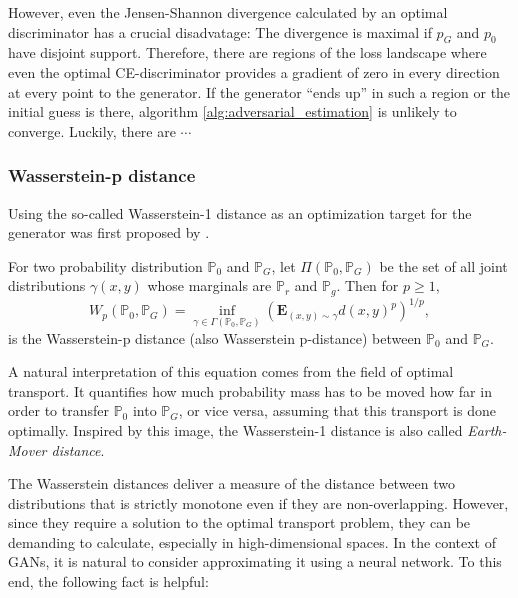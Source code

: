 However, even the Jensen-Shannon divergence calculated by an optimal discriminator has a crucial disadvatage:
The divergence is maximal if $p_G$ and $p_0$ have disjoint support. %
Therefore, there are regions of the loss landscape where even the optimal CE-discriminator provides a gradient of zero in every direction at every point to the generator.
If the generator ``ends up'' in such a region or the initial guess is there, algorithm \ref{alg:adversarial_estimation} is unlikely to converge.
Luckily, there are $\cdots$

\subsubsection{Wasserstein-p distance}
\label{sec:wasserstein_loss}

Using the so-called Wasserstein-1 distance as an optimization target for the generator was first proposed by \Textcite{arjovsky2017wassersteingan}.%

\begin{definition}
    For two probability distribution $\mathbb{P}_0$ and $\mathbb{P}_G$, let $\Pi (\mathbb{P}_0, \mathbb{P}_G)$ be the set of all joint distributions $\gamma(x, y)$ whose marginals are $\mathbb{P}_r$ and $\mathbb{P}_g$.
    Then for $p \geq 1$,%
    $$
    W_p(\mathbb{P}_0, \mathbb{P}_G) = \inf_{\gamma \in \Gamma(\mathbb{P}_0, \mathbb{P}_G)} \left(\mathbf{E}_{(x, y) \sim \gamma} d(x, y)^p \right)^{1/p},
    $$
    is the Wasserstein-p distance (also Wasserstein p-distance) between $\mathbb{P}_0$ and $\mathbb{P}_G$.
\end{definition}

A natural interpretation of this equation comes from the field of optimal transport.
It quantifies how much probability mass has to be moved how far in order to transfer $\mathbb{P}_0$ into $\mathbb{P}_G$, or vice versa, assuming that this transport is done optimally.
Inspired by this image, the Wasserstein-1 distance is also called \textit{Earth-Mover distance}.

The Wasserstein distances deliver a measure of the distance between two distributions that is strictly monotone even if they are non-overlapping. %
However, since they require a solution to the optimal transport problem, they can be demanding to calculate, especially in high-dimensional spaces. %
In the context of GANs, it is natural to consider approximating it using a neural network.
To this end, the following fact is helpful:

